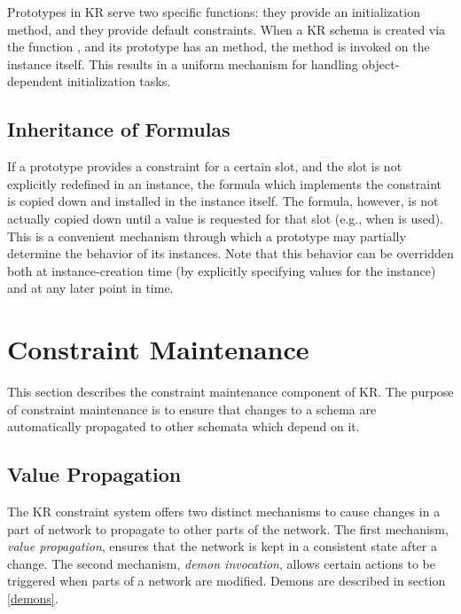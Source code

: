 Prototypes in KR serve two specific functions: they provide an
initialization method, and they provide
default constraints.
When a KR schema is created via the function
, and its prototype has an
 method, the method is invoked
on the instance itself.  This results in a uniform mechanism for handling
object-dependent initialization tasks.


\section{Inheritance of Formulas}

If a prototype provides a constraint for a certain slot, and the slot is
not explicitly redefined in an instance, the formula which implements the constraint is copied down and installed in
the instance itself.  The formula, however, is not actually copied down until
a value is requested for that slot (e.g., when  is used).
This is a convenient mechanism through which a
prototype may partially determine the behavior of its instances.  Note that
this behavior can be overridden both at instance-creation time (by
explicitly specifying values for the instance) and at any later point in
time.




\chapter{Constraint Maintenance}
\value{top}


This section describes the constraint maintenance component of KR.
The purpose of constraint maintenance is to ensure that changes to a
schema are automatically propagated to other schemata which depend on
it.



\section{Value Propagation}
\value{s-top}

The KR constraint system offers two distinct
mechanisms to cause changes in a part of network to propagate to other
parts of the network.  The first mechanism, {\it value propagation}, ensures
that the network is kept in a consistent state after a change.  The second
mechanism, {\it demon invocation}, allows certain actions to be triggered
when parts of a network are modified.  Demons are described in section
\ref{demons}.

